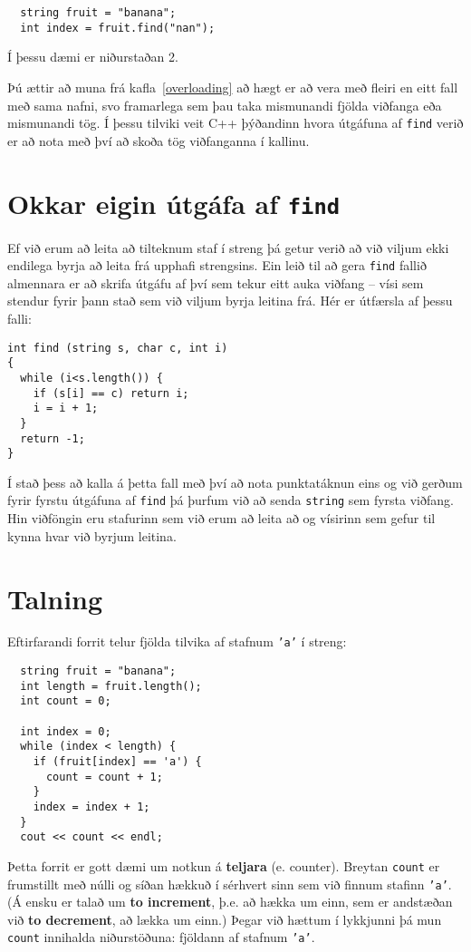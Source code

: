 \begin{verbatim}
  string fruit = "banana";
  int index = fruit.find("nan");
\end{verbatim}
%
Í þessu dæmi er niðurstaðan 2.

Þú ættir að muna frá kafla~\ref{overloading} að hægt er að vera með fleiri en eitt fall með sama nafni,
svo framarlega sem þau taka mismunandi fjölda viðfanga eða mismunandi tög.
Í þessu tilviki veit C++ þýðandinn hvora útgáfuna af {\tt find} verið er að nota með því að skoða tög viðfanganna í kallinu.

\section{Okkar eigin útgáfa af {\tt find}}

Ef við erum að leita að tilteknum staf í streng þá getur verið að við viljum ekki endilega byrja að leita frá upphafi strengsins. 
Ein leið til að gera {\tt find} fallið almennara er að skrifa útgáfu af því sem tekur eitt auka viðfang -- vísi sem stendur fyrir þann stað sem við viljum byrja leitina frá.
Hér er útfærsla af þessu falli:

\begin{verbatim}
int find (string s, char c, int i)
{
  while (i<s.length()) {
    if (s[i] == c) return i;
    i = i + 1;
  }
  return -1;
}
\end{verbatim}
%
Í stað þess að kalla á þetta fall með því að nota punktatáknun eins og við gerðum fyrir fyrstu útgáfuna af {\tt find}
þá þurfum við að senda {\tt string} sem fyrsta viðfang.
Hin viðföngin eru stafurinn sem við erum að leita að og vísirinn sem gefur til kynna hvar við byrjum leitina.

\section{Talning}
\label{loopcount}

Eftirfarandi forrit telur fjölda tilvika af stafnum {\tt 'a'} í streng:

\begin{verbatim}
  string fruit = "banana";
  int length = fruit.length();
  int count = 0;

  int index = 0;
  while (index < length) {
    if (fruit[index] == 'a') {
      count = count + 1;
    }
    index = index + 1;
  }
  cout << count << endl;
\end{verbatim}
%
Þetta forrit er gott dæmi um notkun á {\bf teljara} (e. counter).
Breytan {\tt count} er frumstillt með núlli og síðan hækkuð í sérhvert sinn sem við finnum stafinn {\tt 'a'}.
(Á ensku er talað um {\bf to increment}, þ.e. að hækka um einn, sem er andstæðan við {\bf to decrement}, að lækka um einn.)
Þegar við hættum í lykkjunni þá mun {\tt count} innihalda niðurstöðuna: fjöldann af stafnum {\tt 'a'}.

